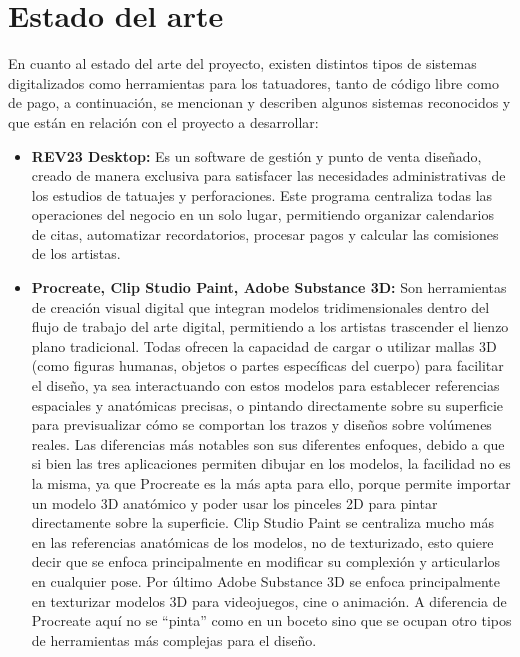 \section{Estado del arte}

En cuanto al estado del arte del proyecto, existen distintos tipos de sistemas digitalizados como herramientas para los tatuadores, tanto de código libre como de pago, a continuación, se mencionan y describen algunos sistemas reconocidos y que están en relación con el proyecto a desarrollar:

\begin{itemize}
  \item \textbf{ REV23 Desktop\cite{rev23}:} Es un software de gestión y punto de venta diseñado, creado de manera exclusiva para satisfacer las necesidades administrativas de los estudios de tatuajes y perforaciones. Este programa centraliza todas las operaciones del negocio en un solo lugar, permitiendo organizar calendarios de citas, automatizar recordatorios, procesar pagos y calcular las comisiones de los artistas.

  \item \textbf{Procreate, Clip Studio Paint, Adobe Substance 3D:} Son herramientas de creación visual digital que integran modelos tridimensionales dentro del flujo de trabajo del arte digital, permitiendo a los artistas trascender el lienzo plano tradicional. Todas ofrecen la capacidad de cargar o utilizar mallas 3D (como figuras humanas, objetos o partes específicas del cuerpo) para facilitar el diseño, ya sea interactuando con estos modelos para establecer referencias espaciales y anatómicas precisas, o pintando directamente sobre su superficie para previsualizar cómo se comportan los trazos y diseños sobre volúmenes reales. Las diferencias más notables son sus diferentes enfoques, debido a que si bien las tres aplicaciones permiten dibujar en los modelos, la facilidad no es la misma, ya que Procreate\cite{procreate} es la más apta para ello, porque permite importar un modelo 3D anatómico y poder usar los pinceles 2D para pintar directamente sobre la superficie. Clip Studio Paint\cite{clipstudio} se centraliza mucho más en las referencias anatómicas de los modelos, no de texturizado, esto quiere decir que se enfoca principalmente en modificar su complexión y articularlos en cualquier pose. Por último Adobe Substance 3D\cite{substance} se enfoca principalmente en texturizar modelos 3D para videojuegos, cine o animación. A diferencia de Procreate aquí no se ``pinta'' como en un boceto sino que se ocupan otro tipos de herramientas más complejas para el diseño.


\end{itemize}

